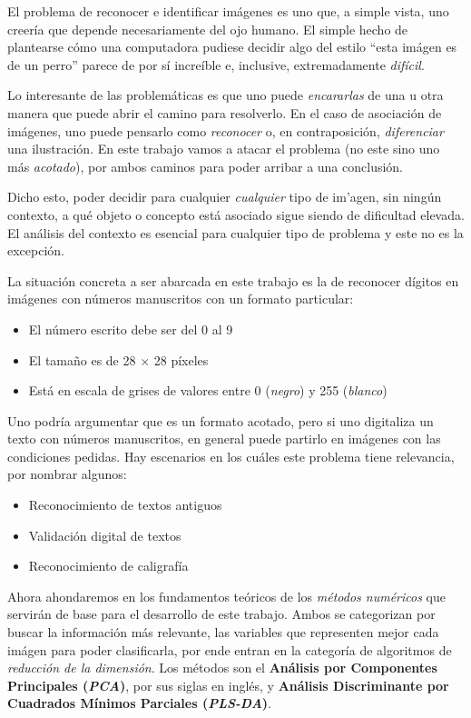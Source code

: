 El problema de reconocer e identificar im\'agenes es uno que, a simple vista, uno creer\'ia que depende necesariamente del ojo humano. El simple hecho de plantearse c\'omo una computadora pudiese decidir algo del estilo ``esta im\'agen es de un perro'' parece de por s\'i incre\'ible e, inclusive, extremadamente \textit{dif\'icil}.

Lo interesante de las problem\'aticas es que uno puede \textit{encararlas} de una u otra manera que puede abrir el camino para resolverlo. En el caso de asociaci\'on de im\'agenes, uno puede pensarlo como \textit{reconocer} o, en contraposici\'on, \textit{diferenciar} una ilustraci\'on. En este trabajo vamos a atacar el problema (no este sino uno m\'as \textit{acotado}), por ambos caminos para poder arribar a una conclusi\'on.

Dicho esto, poder decidir para cualquier \textit{cualquier} tipo de im'agen, sin ning\'un contexto, a qu\'e objeto o concepto est\'a asociado sigue siendo de dificultad elevada. El an\'alisis del contexto es esencial para cualquier tipo de problema y este no es la excepci\'on.

La situaci\'on concreta a ser abarcada en este trabajo es la de reconocer d\'igitos en im\'agenes con n\'umeros manuscritos con un formato particular:

\begin{itemize}
\item El n\'umero escrito debe ser del 0 al 9
\item El tamaño es de 28 $\times$ 28 p\'ixeles
\item Est\'a en escala de grises de valores entre 0 (\textit{negro}) y 255 (\textit{blanco})
\end{itemize}

Uno podr\'ia argumentar que es un formato acotado, pero si uno digitaliza un texto con n\'umeros manuscritos, en general puede partirlo en im\'agenes con las condiciones pedidas. Hay escenarios en los cu\'ales este problema tiene relevancia, por nombrar algunos:

\begin{itemize}
\item Reconocimiento de textos antiguos
\item Validaci\'on digital de textos
\item Reconocimiento de caligraf\'ia
\end{itemize}

Ahora ahondaremos en los fundamentos te\'oricos de los \textit{m\'etodos num\'ericos} que servir\'an de base para el desarrollo de este trabajo. Ambos se categorizan por buscar la informaci\'on m\'as relevante, las variables que representen mejor cada im\'agen para poder clasificarla, por ende entran en la categor\'ia de algoritmos de \textit{reducci\'on de la dimensi\'on}. Los m\'etodos son el \textbf{An\'alisis por Componentes Principales (\textit{PCA})}, por sus siglas en ingl\'es, y \textbf{An\'alisis Discriminante por Cuadrados M\'inimos Parciales (\textit{PLS-DA})}.

